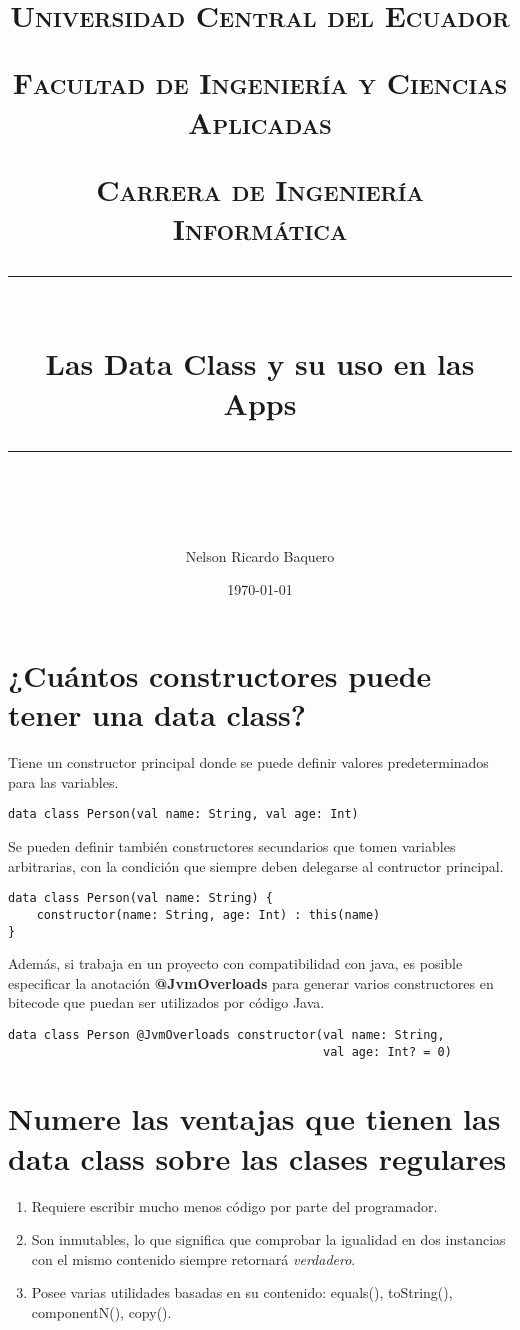 \documentclass[11pt]{scrartcl} %
\title{	
	\normalfont\normalsize
	\textsc{Universidad Central del Ecuador}

	\textsc{Facultad de Ingeniería y Ciencias Aplicadas}

	\textsc{Carrera de Ingeniería Informática}
	\vspace{6pt} %
	\rule{\linewidth}{0.5pt}\\ %
	\vspace{20pt} %
	{\huge Las Data Class y su uso en las Apps}\\ %
	\vspace{12pt} %
	\rule{\linewidth}{2pt}\\ %
	\vspace{12pt} %
}
\author{\LARGE Nelson Ricardo Baquero} %
\date{\normalsize\today} %
\begin{document}
\maketitle %


\section{¿Cuántos constructores puede tener una data class?}

Tiene un constructor principal donde se puede definir valores predeterminados para las variables.

\begin{lstlisting}
data class Person(val name: String, val age: Int)
\end{lstlisting}

Se pueden definir también constructores secundarios que tomen variables arbitrarias, con la condición que siempre deben delegarse al contructor principal.

\begin{lstlisting}
data class Person(val name: String) {
    constructor(name: String, age: Int) : this(name)
}
\end{lstlisting}

Además, si trabaja en un proyecto con compatibilidad con java, es posible especificar la anotación \textbf{@JvmOverloads} para generar varios constructores en bitecode que puedan ser utilizados por código Java.

\begin{lstlisting}
data class Person @JvmOverloads constructor(val name: String, 
                                            val age: Int? = 0)
\end{lstlisting}


\section{Numere las ventajas que tienen las data class sobre las clases regulares}

\begin{enumerate}
	\item Requiere escribir mucho menos código por parte del programador.
	\item Son inmutables, lo que significa que comprobar la igualidad en dos instancias con el mismo contenido siempre retornará \emph{verdadero}.
	\item Posee varias utilidades basadas en su contenido: equals(), toString(), componentN(), copy().
\end{enumerate}
\end{document}
